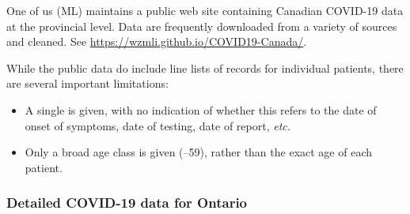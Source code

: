 \documentclass[12pt]{article}\usepackage[]{graphicx}\usepackage[]{color}
\begin{document}
One of us (ML) maintains a public web site containing Canadian
COVID-19 data at the provincial level.  Data are frequently downloaded
from a variety of sources and cleaned.  See
\url{https://wzmli.github.io/COVID19-Canada/}.

While the public data do include line lists of records for individual
patients, there are several important limitations: 
\begin{itemize}
\item A single  is given, with no indication of
  whether this refers to the date of onset of symptoms, date of
  testing, date of report, \emph{etc.}
\item Only a broad age class is given (--59), rather than the
  exact age of each patient.
\end{itemize}

\subsubsection*{Detailed COVID-19 data for Ontario}
\end{document}
